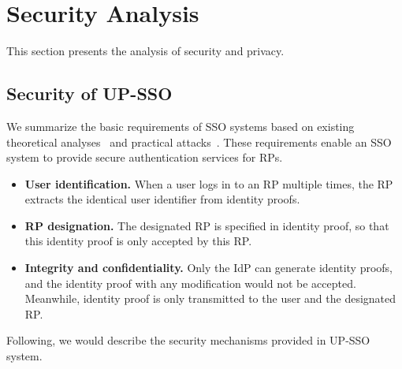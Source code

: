 \section{Security Analysis}
\label{sec:analysis}
This section presents the analysis of security and privacy. 

\subsection{Security of UP-SSO}
We summarize the basic requirements of SSO systems based on existing theoretical analyses~\cite{ArmandoCCCT08,FettKS16, FettKS17} and practical attacks~\cite{SomorovskyMSKJ12,WangCW12,ArmandoCCCPS13,WangZLG16,MainkaMS16,MainkaMSW17,YangLCZ18}. These requirements enable an SSO system to provide secure authentication services for RPs.
\begin{itemize}
\item
\textbf{User identification.} When a user logs in to an RP multiple times,
 the RP extracts the identical user identifier from identity proofs.

\item
\textbf{RP designation.} The designated RP is specified in identity proof,
    so that this identity proof is  only accepted by this RP.

\item
\textbf{Integrity and confidentiality.}
 Only the IdP can generate identity proofs,
and the identity proof with any modification would not be accepted.
Meanwhile, identity proof is only transmitted to the user and the designated RP.
\end{itemize}


Following, we would describe the security mechanisms provided in UP-SSO system. 

